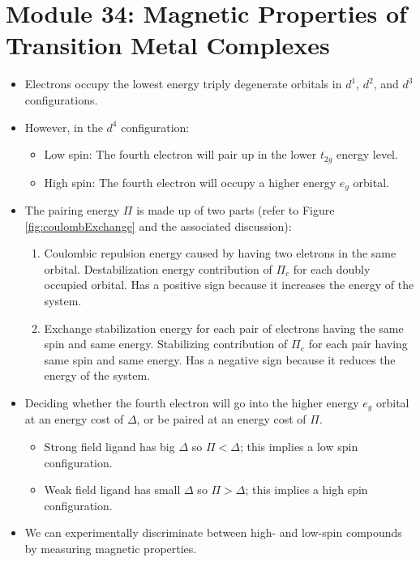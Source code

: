 \documentclass[../notes.tex]{subfiles}
\begin{document}
\section{Module 34: Magnetic Properties of Transition Metal Complexes}
\begin{itemize}
    \item {}Electrons occupy the lowest energy triply degenerate orbitals in $d^1$, $d^2$, and $d^3$ configurations.
    \item However, in the $d^4$ configuration:
    \begin{itemize}
        \item Low spin: The fourth electron will pair up in the lower $t_{2g}$ energy level.
        \item High spin: The fourth electron will occupy a higher energy $e_g$ orbital.
    \end{itemize}
    \item The pairing energy $\Pi$ is made up of two parts (refer to Figure \ref{fig:coulombExchange} and the associated discussion):
    \begin{enumerate}
        \item Coulombic repulsion energy caused by having two eletrons in the same orbital. Destabilization energy contribution of $\Pi_c$ for each doubly occupied orbital. Has a positive sign because it increases the energy of the system.
        \item Exchange stabilization energy for each pair of electrons having the same spin and same energy. Stabilizing contribution of $\Pi_e$ for each pair having same spin and same energy. Has a negative sign because it reduces the energy of the system.
    \end{enumerate}
    \item Deciding whether the fourth electron will go into the higher energy $e_g$ orbital at an energy cost of $\Delta$, or be paired at an energy cost of $\Pi$.
    \begin{itemize}
        \item Strong field ligand has big $\Delta$ so $\Pi<\Delta$; this implies a low spin configuration.
        \item Weak field ligand has small $\Delta$ so $\Pi>\Delta$; this implies a high spin configuration.
    \end{itemize}
    \item We can experimentally discriminate between high- and low-spin compounds by measuring magnetic properties.
    \begin{itemize}

\end{itemize}
\end{itemize}
\end{document}
